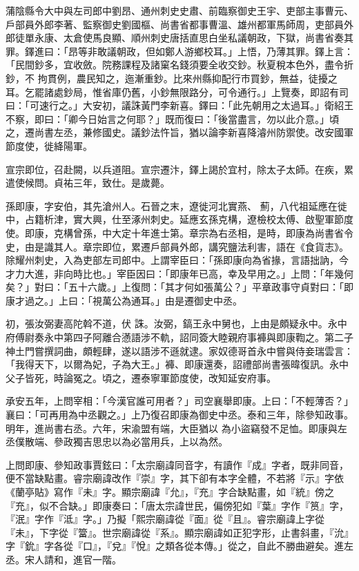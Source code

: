 \begin{pinyinscope}
 蒲陰縣令大中與左司郎中劉昂、通州刺史史肅、前臨察御史王宇、吏部主事曹元、戶部員外郎李著、監察御史劉國樞、尚書省都事曹溫、雄州都軍馬師周，吏部員外郎徒單永康、太倉使馬良顯、順州刺史唐括直思白坐私議朝政，下獄，尚書省奏其罪。鐸進曰：「昂等非敢議朝政，但如鄭人游鄉校耳。」上悟，乃薄其罪。鐸上言：「民間鈔多，宜收斂。院務課程及諸窠名錢須要全收交鈔。秋夏稅本色外，盡令折鈔，不
 拘貫例，農民知之，迤漸重鈔。比來州縣抑配行市買鈔，無益，徒擾之耳。乞罷諸處鈔局，惟省庫仍舊，小鈔無限路分，可令通行。」上覽奏，即詔有司曰：「可速行之。」大安初，議誅黃門李新喜。鐸曰：「此先朝用之太過耳。」衛紹王不察，即曰：「卿今日始言之何耶？」既而復曰：「後當盡言，勿以此介意。」頃之，遷尚書左丞，兼修國史。議鈔法忤旨，猶以論李新喜降濬州防禦使。改安國軍節度使，徙絳陽軍。



 宣宗即位，召赴闕，以兵道阻。宣宗遷汴，鐸上謁於宜村，除太子太師。在疾，累遣使候問。貞祐三年，致仕。是歲薨。



 孫即康，字安伯，其先滄州人。石晉之末，遼徙河北實燕、
 薊，八代祖延應在徙中，占籍析津，實大興，仕至涿州刺史。延應玄孫克構，遼檢校太傅、啟聖軍節度使。即康，克構曾孫，中大定十年進士第。章宗為右丞相，是時，即康為尚書省令史，由是識其人。章宗即位，累遷戶部員外郎，講究鹽法利害，語在《食貨志》。除耀州刺史，入為吏部左司郎中。上謂宰臣曰：「孫即康向為省掾，言語拙訥，今才力大進，非向時比也。」宰臣因曰：「即康年已高，幸及早用之。」上問：「年幾何矣？」對曰：「五十六歲。」上復問：「其才何如張萬公？」平章政事守貞對曰：「即康才過之。」上曰：「視萬公為通耳。」由是遷御史中丞。



 初，張汝弼妻高陀斡不道，伏
 誅。汝弼，鎬王永中舅也，上由是頗疑永中。永中府傅尉奏永中第四子阿離合懣語涉不軌，詔同簽大睦親府事褲與即康鞫之。第二子神土門嘗撰詞曲，頗輕肆，遂以語涉不遜就逮。家奴德哥首永中嘗與侍妾瑞雲言：「我得天下，以爾為妃，子為大王。」褲、即康還奏，詔禮部尚書張暐復訊。永中父子皆死，時論冤之。頃之，遷泰寧軍節度使，改知延安府事。



 承安五年，上問宰相：「今漢官誰可用者？」司空襄舉即康。上曰：「不輕薄否？」襄曰：「可再用為中丞觀之。」上乃復召即康為御史中丞。泰和三年，除參知政事。明年，進尚書右丞。六年，宋渝盟有端，大臣猶以
 為小盜竊發不足恤。即康與左丞僕散端、參政獨吉思忠以為必當用兵，上以為然。



 上問即康、參知政事賈鉉曰：「太宗廟諱同音字，有讀作『成』字者，既非同音，便不當缺點畫。睿宗廟諱改作『崇』字，其下卻有本字全體，不若將『示』字依《蘭亭貼》寫作『未』字。顯宗廟諱『允』，『充』字合缺點畫，如『統』傍之『充』，似不合缺。」即康奏曰：「唐太宗諱世民，偏傍犯如『葉』字作『筼』字，『泯』字作『泜』字。」乃擬「熙宗廟諱從『面』從『且』。睿宗廟諱上字從『未』，下字從『簹』。世宗廟諱從『系』。顯宗廟諱如正犯字形，止書斜畫，『沇』字『鈗』字各從『口』，『兌』『悅』之類各從本傳。」從之，自此不勝曲避矣。進左丞。宋人請和，進官一階。




\end{pinyinscope}
